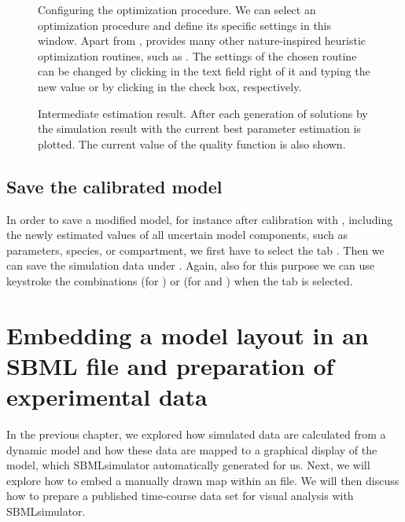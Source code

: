 \begin{SCfigure}
{}
\caption[Configuring the optimization procedure]{Configuring the optimization procedure.
We can select an optimization procedure and define its specific settings in this window. 
Apart from \DE \citep{Storn96Usage}, \EvA provides many other nature-inspired heuristic optimization routines, such as \PSO \citep{ClercKennedy02, Clerc2005}.
The settings of the chosen routine can be changed by clicking in the text field right of it and typing the new value or by clicking in the check box, respectively.}
\label{fig:algorithmChoice}
\end{SCfigure}


\begin{figure}[h]
\centering
{}
\caption[Intermediate estimation result]{Intermediate estimation result.
After each generation of solutions by \EvA the simulation result with the current best parameter estimation is plotted.
The current value of the quality function is also shown.}
\label{fig:estimationResult}
\end{figure}


\section{Save the calibrated model}

In order to save a modified model, for instance after calibration with \EvA, including the newly estimated values of all uncertain model components, such as parameters, species, or compartment, we first have to select the tab .
Then we can save the simulation data under .
Again, also for this purpose we can use keystroke the combinations  (for \MacOSX) or  (for \Linux and \Windows) when the  tab is selected.



\chapter{Embedding a model layout in an SBML file and preparation of experimental data}
\label{chap:EmbeddingLayoutsInModels}

In the previous chapter, we explored how simulated data are calculated from a dynamic model and how these data are mapped to a graphical display of the model, which SBMLsimulator automatically generated for us.
Next, we will explore how to embed a manually drawn map within an \SBML file.
We will then discuss how to prepare a published time-course data set for visual analysis with SBMLsimulator.

